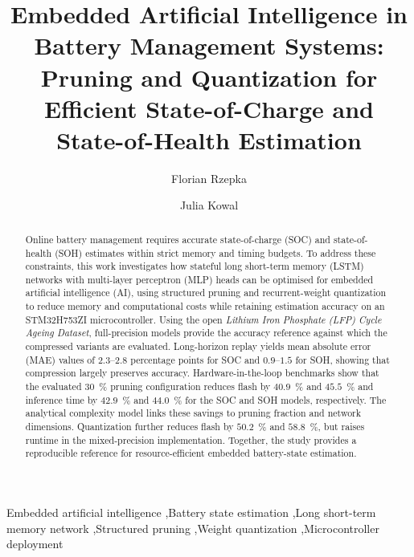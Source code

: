 \documentclass[review]{elsarticle}
\begin{document}
\begin{frontmatter}

\title{Embedded Artificial Intelligence in Battery Management Systems: Pruning and Quantization for Efficient State-of-Charge and State-of-Health Estimation}

\author[1]{Florian Rzepka}

\author[1]{Julia Kowal}



\begin{abstract}
Online battery management requires accurate state-of-charge (SOC) and state-of-health (SOH) estimates within strict memory and timing budgets. To address these constraints, this work investigates how stateful long short-term memory (LSTM) networks with multi-layer perceptron (MLP) heads can be optimised for embedded artificial intelligence (AI), using structured pruning and recurrent-weight quantization to reduce memory and computational costs while retaining estimation accuracy on an STM32H753ZI microcontroller. Using the open \emph{Lithium Iron Phosphate (LFP) Cycle Ageing Dataset}, full-precision models provide the accuracy reference against which the compressed variants are evaluated. Long-horizon replay yields mean absolute error (MAE) values of $2.3$--$2.8$ percentage points for SOC and $0.9$--$1.5$ for SOH, showing that compression largely preserves accuracy. Hardware-in-the-loop benchmarks show that the evaluated 30~\% pruning configuration reduces flash by $40.9$~\% and $45.5$~\% and inference time by $42.9$~\% and $44.0$~\% for the SOC and SOH models, respectively. The analytical complexity model links these savings to pruning fraction and network dimensions. Quantization further reduces flash by $50.2$~\% and $58.8$~\%, but raises runtime in the mixed-precision implementation. Together, the study provides a reproducible reference for resource-efficient embedded battery-state estimation.
\end{abstract}

\begin{keyword}
Embedded artificial intelligence \sep Battery state estimation \sep Long short-term memory network \sep Structured pruning \sep Weight quantization \sep Microcontroller deployment
\end{keyword}

\end{frontmatter}
\end{document}
